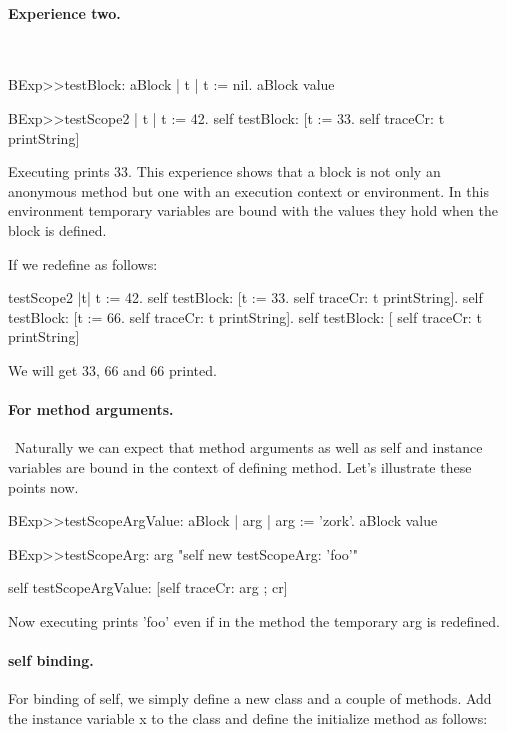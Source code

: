\documentclass[a4paper,10pt,twoside]{book}
\begin{document}
\paragraph{Experience two.}\ 
\begin{code}{}
BExp>>testBlock: aBlock
	| t | 
	t := nil. 
	aBlock value 
	
BExp>>testScope2 
	| t | 
	t := 42. 
	self testBlock: [t := 33.
					self traceCr: t printString] 	
\end{code}

Executing  prints 33. This experience shows that a block is not only an anonymous method but one with an execution context or environment. In this environment temporary variables are bound with the values they hold when the block 
is defined. 

If we redefine  as follows: 

\begin{code}{}
testScope2 
	|t|
	t := 42.
	self testBlock: [t := 33. self traceCr: t printString].
	self testBlock: [t := 66. self traceCr: t printString].
	self testBlock: [ self traceCr: t printString]
\end{code}

We will get 33, 66 and 66 printed.




\paragraph{For method arguments.}\
Naturally we can expect that method arguments as well as self and instance variables are bound 
in the context of defining method. Let's illustrate these points now. 

\begin{code}{}
BExp>>testScopeArgValue: aBlock
	| arg | 
	arg := 'zork'.
	aBlock value
	
BExp>>testScopeArg: arg
	"self new testScopeArg: 'foo'"
	
	self testScopeArgValue: [self traceCr: arg ; cr]
\end{code}

Now executing  prints 'foo' even if in the method  the temporary arg is redefined.
 

\paragraph{self binding.}
For binding of self, we simply define a new class and a couple of methods. 
Add the instance variable x to the class  and define the initialize method as follows:
\end{document}
